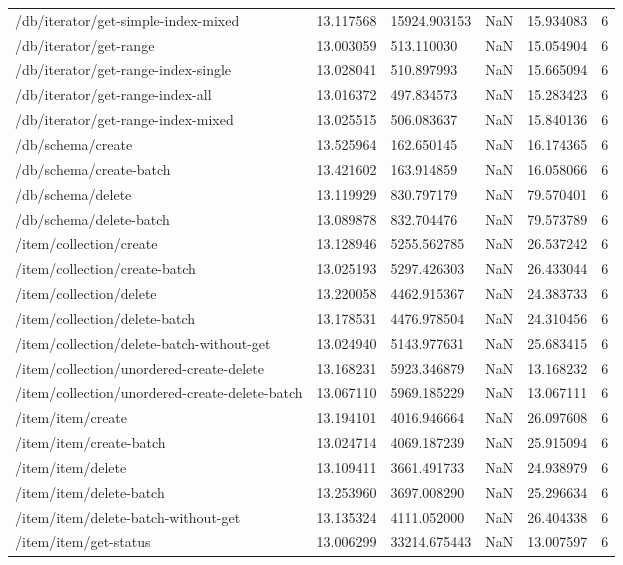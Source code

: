 \begin{tabularx}{\linewidth}{XXXXXX}
/db/iterator/get-simple-index-mixed & 13.117568 & 15924.903153 & NaN & 15.934083 & 6 \\
/db/iterator/get-range & 13.003059 & 513.110030 & NaN & 15.054904 & 6 \\
/db/iterator/get-range-index-single & 13.028041 & 510.897993 & NaN & 15.665094 & 6 \\
/db/iterator/get-range-index-all & 13.016372 & 497.834573 & NaN & 15.283423 & 6 \\
/db/iterator/get-range-index-mixed & 13.025515 & 506.083637 & NaN & 15.840136 & 6 \\
/db/schema/create & 13.525964 & 162.650145 & NaN & 16.174365 & 6 \\
/db/schema/create-batch & 13.421602 & 163.914859 & NaN & 16.058066 & 6 \\
/db/schema/delete & 13.119929 & 830.797179 & NaN & 79.570401 & 6 \\
/db/schema/delete-batch & 13.089878 & 832.704476 & NaN & 79.573789 & 6 \\
/item/collection/create & 13.128946 & 5255.562785 & NaN & 26.537242 & 6 \\
/item/collection/create-batch & 13.025193 & 5297.426303 & NaN & 26.433044 & 6 \\
/item/collection/delete & 13.220058 & 4462.915367 & NaN & 24.383733 & 6 \\
/item/collection/delete-batch & 13.178531 & 4476.978504 & NaN & 24.310456 & 6 \\
/item/collection/delete-batch-without-get & 13.024940 & 5143.977631 & NaN & 25.683415 & 6 \\
/item/collection/unordered-create-delete & 13.168231 & 5923.346879 & NaN & 13.168232 & 6 \\
/item/collection/unordered-create-delete-batch & 13.067110 & 5969.185229 & NaN & 13.067111 & 6 \\
/item/item/create & 13.194101 & 4016.946664 & NaN & 26.097608 & 6 \\
/item/item/create-batch & 13.024714 & 4069.187239 & NaN & 25.915094 & 6 \\
/item/item/delete & 13.109411 & 3661.491733 & NaN & 24.938979 & 6 \\
/item/item/delete-batch & 13.253960 & 3697.008290 & NaN & 25.296634 & 6 \\
/item/item/delete-batch-without-get & 13.135324 & 4111.052000 & NaN & 26.404338 & 6 \\
/item/item/get-status & 13.006299 & 33214.675443 & NaN & 13.007597 & 6 \\

\end{tabularx}
